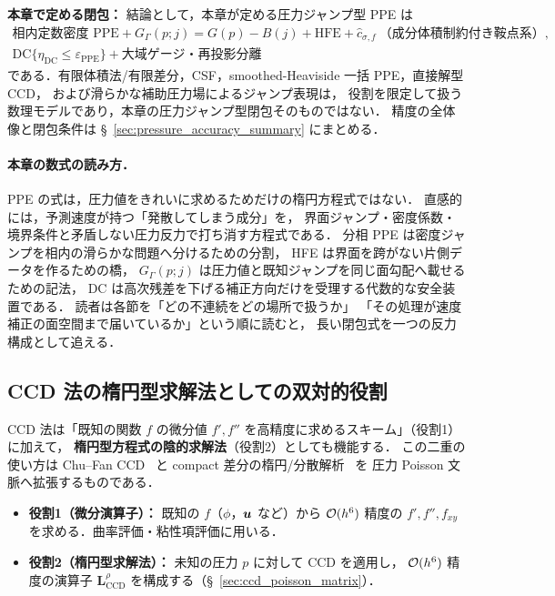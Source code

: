 \noindent\textbf{本章で定める閉包：}
結論として，本章が定める圧力ジャンプ型 PPE は
\[
\begin{gathered}
  \text{相内定数密度 PPE}
  +G_\Gamma(p;j)=G(p)-B(j)
  +\mathrm{HFE}
  +\widehat c_{\sigma,f}\ \text{（成分体積制約付き鞍点系）},\\
  \mathrm{DC}\{\eta_{\mathrm{DC}}\le\varepsilon_{\mathrm{PPE}}\}
  +\text{大域ゲージ・再投影分離}
\end{gathered}
\]
である．有限体積法/有限差分，CSF，smoothed-Heaviside 一括 PPE，直接解型 CCD，
および滑らかな補助圧力場によるジャンプ表現は，
役割を限定して扱う数理モデルであり，本章の圧力ジャンプ型閉包そのものではない．
精度の全体像と閉包条件は §~\ref{sec:pressure_accuracy_summary} にまとめる．

\paragraph{本章の数式の読み方．}
PPE の式は，圧力値をきれいに求めるためだけの楕円方程式ではない．
直感的には，予測速度が持つ「発散してしまう成分」を，
界面ジャンプ・密度係数・境界条件と矛盾しない圧力反力で打ち消す方程式である．
分相 PPE は密度ジャンプを相内の滑らかな問題へ分けるための分割，
HFE は界面を跨がない片側データを作るための橋，
$G_\Gamma(p;j)$ は圧力値と既知ジャンプを同じ面勾配へ載せるための記法，
DC は高次残差を下げる補正方向だけを受理する代数的な安全装置である．
読者は各節を「どの不連続をどの場所で扱うか」
「その処理が速度補正の面空間まで届いているか」という順に読むと，
長い閉包式を一つの反力構成として追える．

\subsection{CCD 法の楕円型求解法としての双対的役割}
\label{sec:ccd_elliptic}

CCD 法は「既知の関数 $f$ の微分値 $f', f''$ を高精度に求めるスキーム」（役割1）に加えて，
\textbf{楕円型方程式の陰的求解法}（役割2）としても機能する．
この二重の使い方は Chu--Fan CCD~\cite{ChuFan1998} と
compact 差分の楕円/分散解析~\cite{Lele1992,VisbalGaitonde2002} を
圧力 Poisson 文脈へ拡張するものである．

\begin{itemize}
  \item \textbf{役割1（微分演算子）：} 既知の $f$（$\phi$，$\bm{u}$ など）から $\mathcal{O}(h^6)$ 精度の
        $f', f'', f_{xy}$ を求める．曲率評価・粘性項評価に用いる．
  \item \textbf{役割2（楕円型求解法）：} 未知の圧力 $p$ に対して CCD を適用し，
        $\mathcal{O}(h^6)$ 精度の演算子 $\mathbf{L}_{\mathrm{CCD}}^{\rho}$ を構成する（§~\ref{sec:ccd_poisson_matrix}）．
\end{itemize}

